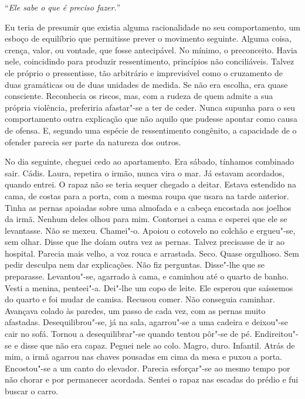 ``\emph{Ele sabe o que é preciso fazer.}''

Eu teria de presumir que existia alguma racionalidade no seu
comportamento, um esboço de equilíbrio que permitisse prever o movimento
seguinte. Alguma coisa, crença, valor, ou vontade, que fosse
antecipável. No mínimo, o preconceito. Havia nele, coincidindo para
produzir ressentimento, princípios não conciliáveis. Talvez ele próprio
o pressentisse, tão arbitrário e imprevisível como o cruzamento de duas
gramáticas ou de duas unidades de medida. Se não era escolha, era quase
consciente. Reconhecia os riscos, mas, com a rudeza de quem admite a sua
própria violência, preferiria afastar"-se a ter de ceder. Nunca supunha
para o seu comportamento outra explicação que não aquilo que pudesse
apontar como causa de ofensa. E, segundo uma espécie de ressentimento
congênito, a capacidade de o ofender parecia ser parte da natureza dos
outros.

No dia seguinte, cheguei cedo ao apartamento. Era sábado, tínhamos
combinado sair. Cádis. Laura, repetira o irmão, nunca vira o mar. Já
estavam acordados, quando entrei. O rapaz não se teria sequer chegado a
deitar. Estava estendido na cama, de costas para a porta, com a mesma
roupa que usara na tarde anterior. Tinha as pernas apoiadas sobre uma
almofada e a cabeça encostada aos joelhos da irmã. Nenhum deles olhou
para mim. Contornei a cama e esperei que ele se levantasse. Não se
mexeu. Chamei"-o. Apoiou o cotovelo no colchão e ergueu"-se, sem olhar.
Disse que lhe doíam outra vez as pernas. Talvez precisasse de ir ao
hospital. Parecia mais velho, a voz rouca e arrastada. Seco. Quase
orgulhoso. Sem pedir desculpa nem dar explicações. Não fiz perguntas.
Disse"-lhe que se preparasse. Levantou"-se, agarrado à cama, e caminhou
até o quarto de banho. Vesti a menina, penteei"-a. Dei"-lhe um copo de
leite. Ele esperou que saíssemos do quarto e foi mudar de camisa.
Recusou comer. Não conseguia caminhar. Avançava colado às paredes, um
passo de cada vez, com as pernas muito afastadas. Desequilibrou"-se, já
na sala, agarrou"-se a uma cadeira e deixou"-se cair no sofá. Tornou a
desequilibrar"-se quando tentou pôr"-se de pé. Endireitou"-se e disse
que não era capaz. Peguei nele ao colo. Magro, duro. Infantil. Atrás de
mim, a irmã agarrou nas chaves pousadas em cima da mesa e puxou a porta.
Encostou"-se a um canto do elevador. Parecia esforçar"-se ao mesmo tempo
por não chorar e por permanecer acordada. Sentei o rapaz nas escadas do
prédio e fui buscar o carro.

